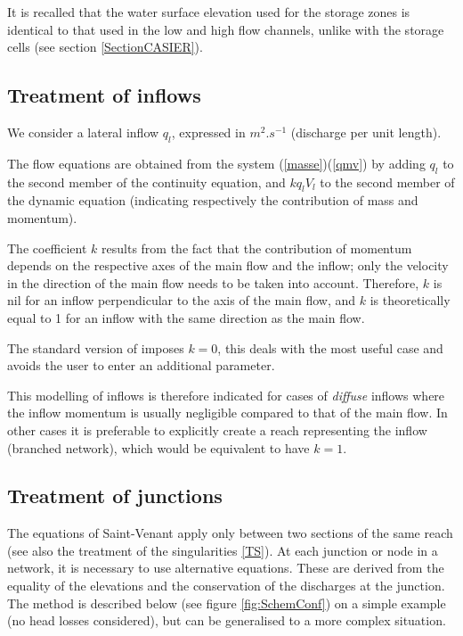 It is recalled that the water surface elevation used for the storage zones is identical to that used in the low and high flow channels, unlike with the storage cells (see section \ref{SectionCASIER}).



\subsection{Treatment of inflows}
\label{TraitAp}

We consider a lateral inflow $q_l$, expressed in $m^2.s^{-1}$ (discharge per unit length).

The flow equations are obtained from the system (\ref{masse})(\ref{qmv}) by adding $q_l$ to the second member of the continuity equation, and $k q_l V_l$ to the second member of the dynamic equation (indicating respectively the contribution of mass and momentum).

The coefficient $k$ results from the fact that the contribution of momentum depends on the respective axes of the main flow and the inflow; only the velocity in the direction of the main flow needs to be taken into account. Therefore, $k$ is nil for an inflow perpendicular to the axis of the main flow,
and $k$ is theoretically equal to 1 for an inflow with the same direction as the main flow.

The standard version of \mascaret{} imposes $k = 0$, this deals with the most useful case and avoids the user to enter an additional parameter.

This modelling of inflows is therefore indicated for cases of \textit{diffuse} inflows where the inflow momentum is usually negligible compared to that of the main flow. In other cases it is preferable to explicitly create a reach representing the inflow (branched network), which would be equivalent to have $k = 1$.

\subsection{Treatment of junctions}
\label{TrNd}

The equations of Saint-Venant apply only between two sections of the same reach (see also the treatment of the singularities \ref{TS}). At each junction or node in a network, it is necessary to use alternative equations.
These are derived from the equality of the elevations and the conservation of the discharges at the junction.
The method is described below (see figure \ref{fig:SchemConf}) on a simple example (no head losses considered), but can be generalised to a more complex situation.

